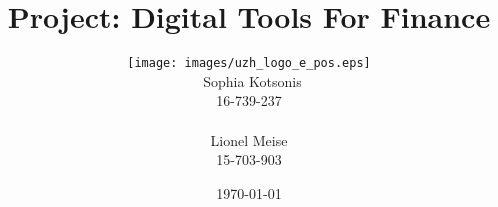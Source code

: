 \title{\textbf{Project: Digital Tools For Finance}
\vspace{50pt}}

\author{\vspace{5mm}
\texttt{[image: images/uzh\_logo\_e\_pos.eps]}\\\
Sophia Kotsonis\\
16-739-237\\\\
Lionel Meise\\
 15-703-903\\}
\vspace{0mm}
\date{\today}
\maketitle
